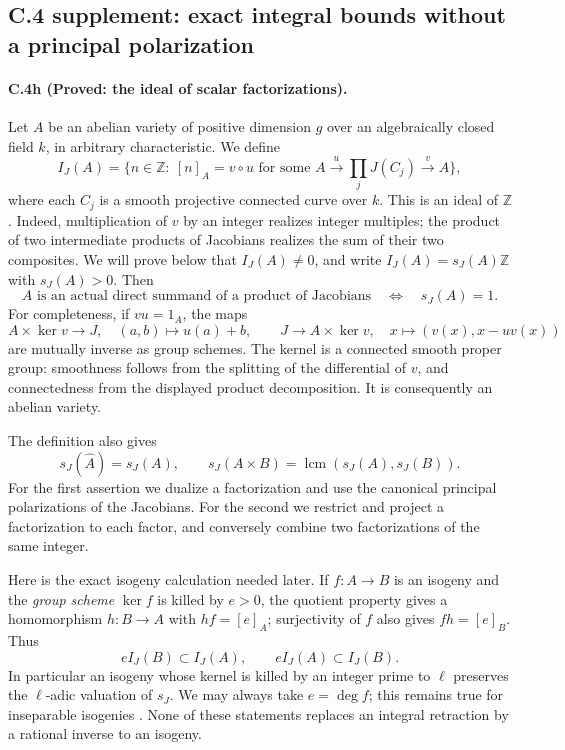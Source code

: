 \subsection{C.4 supplement: exact integral bounds without a principal polarization}
\label{sec:c4-nonprincipal-supplement}

\paragraph{C.4h (Proved: the ideal of scalar factorizations).}
Let $A$ be an abelian variety of positive dimension $g$ over an
algebraically closed field $k$, in arbitrary characteristic. We define
\[
 I_J(A)=\{n\in\mathbb Z:\ [n]_A=v\circ u
       \text{ for some }A\xrightarrow{u}\prod_jJ(C_j)
                           \xrightarrow{v}A\},
\]
where each $C_j$ is a smooth projective connected curve over $k$.
This is an ideal of $\mathbb Z$. Indeed, multiplication of $v$ by an
integer realizes integer multiples; the product of two intermediate
products of Jacobians realizes the sum of their two composites.
We will prove below that $I_J(A)\ne0$, and write
$I_J(A)=s_J(A)\mathbb Z$ with $s_J(A)>0$.
Then
\begin{equation}\label{eq:c4-exact-splitting}
 A\text{ is an actual direct summand of a product of Jacobians}
 \quad\Longleftrightarrow\quad s_J(A)=1.
\end{equation}
For completeness, if $v u=1_A$, the maps
\[
 A\times\ker v\longrightarrow J,\quad(a,b)\longmapsto u(a)+b,
 \qquad
 J\longrightarrow A\times\ker v,\quad
 x\longmapsto(v(x),x-u v(x))
\]
are mutually inverse as group schemes. The kernel is a connected smooth
proper group: smoothness follows from the splitting of the differential
of $v$, and connectedness from the displayed product decomposition.
It is consequently an abelian variety.

The definition also gives
\[
 s_J(\widehat A)=s_J(A),\qquad
 s_J(A\times B)=\operatorname{lcm}(s_J(A),s_J(B)).
\]
For the first assertion we dualize a factorization and use the canonical
principal polarizations of the Jacobians. For the second we restrict and
project a factorization to each factor, and conversely combine two
factorizations of the same integer.

Here is the exact isogeny calculation needed later. If
$f:A\to B$ is an isogeny and the \emph{group scheme} $\ker f$ is killed
by $e>0$, the quotient property gives a homomorphism $h:B\to A$ with
$h f=[e]_A$; surjectivity of $f$ also gives $f h=[e]_B$.
Thus
\begin{equation}\label{eq:c4-isogeny-divisibility}
 eI_J(B)\subset I_J(A),\qquad eI_J(A)\subset I_J(B).
\end{equation}
In particular an isogeny whose kernel is killed by an integer prime to
$\ell$ preserves the $\ell$-adic valuation of $s_J$.
We may always take $e=\deg f$; this remains true for inseparable
isogenies \citep[Section 8, paragraph after Proposition 8.1,
p.~12 of the corrected text]{frC4Milne1986}.
None of these statements replaces an integral retraction by a
rational inverse to an isogeny.


